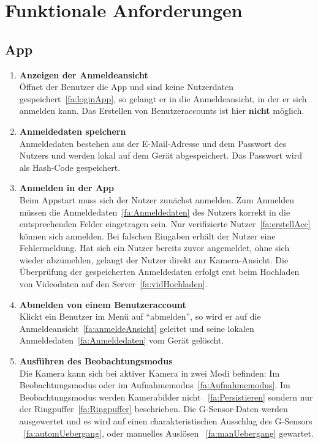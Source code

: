 \chapter{Funktionale Anforderungen}

\section{\gls{App}}
\begin{enumerate}
\renewcommand{\labelenumi}{\textbf{\theenumi}}
\renewcommand{\theenumi}{FA\arabic{enumi}0}
\setcounter{enumi}{99}
\item \label{fa:anmeldeAnsicht} \textbf{Anzeigen der Anmeldeansicht} \hfill \\
Öffnet der Benutzer die \gls{App} und sind keine Nutzerdaten gespeichert~\eqref{fa:loginApp}, so gelangt er in die Anmeldeansicht, in der er sich anmelden kann. Das Erstellen von Benutzeraccounts ist hier \textbf{nicht} möglich.

\item \label{fa:Anmeldedaten}\textbf{Anmeldedaten speichern} \hfill \\
Anmeldedaten bestehen aus der E-Mail-Adresse und dem Passwort des Nutzers und werden lokal auf dem Gerät abgespeichert. Das Passwort wird als \gls{Hash-Code} gespeichert.

\item \label{fa:loginApp} \textbf{Anmelden in der \gls{App}} \hfill \\
Beim Appstart muss sich der Nutzer zunächst anmelden. Zum Anmelden müssen die Anmeldedaten~\eqref{fa:Anmeldedaten} des Nutzers korrekt in die entsprechenden Felder eingetragen sein. Nur verifizierte Nutzer~\eqref{fa:erstellAcc} können sich anmelden. Bei falschen Eingaben erhält der Nutzer eine Fehlermeldung. Hat sich ein Nutzer bereits zuvor angemeldet, ohne sich wieder abzumelden, gelangt der Nutzer direkt zur Kamera-Ansicht. Die Überprüfung der gespeicherten Anmeldedaten erfolgt erst beim Hochladen von Videodaten auf den Server~\eqref{fa:vidHochladen}.

\item \label{fa:logOut}\textbf{Abmelden von einem Benutzeraccount} \hfill \\
Klickt ein Benutzer im Menü auf ``abmelden'', so wird er auf die Anmeldeansicht~\eqref{fa:anmeldeAnsicht} geleitet und seine lokalen Anmeldedaten~\eqref{fa:Anmeldedaten} vom Gerät gelöscht.

\item \label{fa:Beobachtungsmodus}\textbf{Ausführen des Beobachtungsmodus} \hfill \\
Die Kamera kann sich bei aktiver Kamera in zwei Modi befinden: Im Beobachtungsmodus oder im Aufnahmemodus~\eqref{fa:Aufnahmemodus}.
Im Beobachtungsmodus werden Kamerabilder nicht ~\eqref{fa:Persistieren} sondern nur der \gls{Ringpuffer}~\eqref{fa:Ringpuffer} beschrieben. Die \gls{G-Sensor}-Daten werden ausgewertet und es wird auf einen charakteristischen Ausschlag des G-Sensors ~\eqref{fa:automUebergang}, oder manuelles Auslösen ~\eqref{fa:manUebergang} gewartet.


\end{enumerate}
